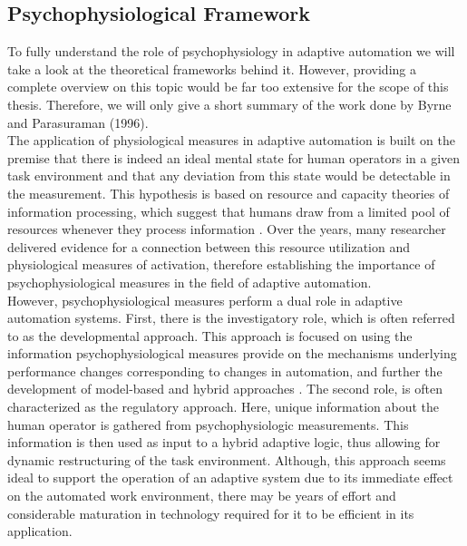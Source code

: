 \subsection{Psychophysiological Framework}
To fully understand the role of psychophysiology in adaptive automation we will take a look at the theoretical frameworks behind it. However, providing a complete overview on this topic would be far too extensive for the scope of this thesis. Therefore, we will only give a short summary of the work done by Byrne and Parasuraman (1996).\\
The application of physiological measures in adaptive automation is built on the premise that there is indeed an ideal mental state for human operators in a given task environment and that any deviation from this state would be detectable in the measurement. 
This hypothesis is based on resource and capacity theories of information processing, which suggest that humans draw from a limited pool of resources whenever they process information \cite{Byrne1996}. Over the years, many researcher delivered evidence for a connection between this resource utilization and physiological measures of activation, therefore establishing the importance of psychophysiological measures in the field of adaptive automation.\\
However, psychophysiological measures perform a dual role in adaptive automation systems. First, there is the investigatory role, which is often referred to as the developmental approach. This approach is focused on using the information psychophysiological measures provide on the mechanisms underlying performance changes corresponding to changes in automation, and further the development of model-based and hybrid approaches \cite{Byrne1996}. The second role, is often characterized as the regulatory approach. Here, unique information about the human operator is gathered from psychophysiologic measurements. This information is then used as input to a hybrid adaptive logic, thus allowing for dynamic restructuring of the task environment. Although, this approach seems ideal to support the operation of an adaptive system due to its immediate effect on the automated work environment, there may be years of effort and considerable maturation in technology required for it to be efficient in its application.  

